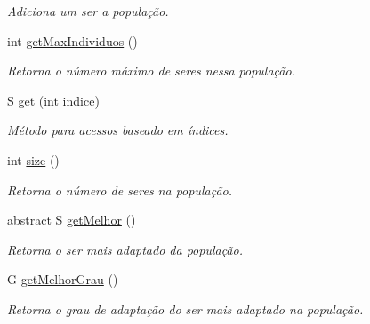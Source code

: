 \begin{DoxyCompactItemize}
\begin{DoxyCompactList}\small\item\em Adiciona um ser a população. \end{DoxyCompactList}\item 
int \hyperlink{classic_1_1populacional_1_1_populacao_3_01_g_01extends_01_number_01_6_comparable_3_01_g_01_4_00_506237fa66af7bbd01f529b68d4beaca_a3c5abfad17ad8ea60283da169c385315}{get\-Max\-Individuos} ()
\begin{DoxyCompactList}\small\item\em Retorna o número máximo de seres nessa população. \end{DoxyCompactList}\item 
S \hyperlink{classic_1_1populacional_1_1_populacao_3_01_g_01extends_01_number_01_6_comparable_3_01_g_01_4_00_506237fa66af7bbd01f529b68d4beaca_acbcdb216574082cb970be119c590200d}{get} (int indice)
\begin{DoxyCompactList}\small\item\em Método para acessos baseado em índices. \end{DoxyCompactList}\item 
int \hyperlink{classic_1_1populacional_1_1_populacao_3_01_g_01extends_01_number_01_6_comparable_3_01_g_01_4_00_506237fa66af7bbd01f529b68d4beaca_a39f905ac398bd8ea00b8babb6d16c43a}{size} ()
\begin{DoxyCompactList}\small\item\em Retorna o número de seres na população. \end{DoxyCompactList}\item 
abstract S \hyperlink{classic_1_1populacional_1_1_populacao_3_01_g_01extends_01_number_01_6_comparable_3_01_g_01_4_00_506237fa66af7bbd01f529b68d4beaca_a1bbf2653a1ed8b5e5c1af9333767a033}{get\-Melhor} ()
\begin{DoxyCompactList}\small\item\em Retorna o ser mais adaptado da população. \end{DoxyCompactList}\item 
G \hyperlink{classic_1_1populacional_1_1_populacao_3_01_g_01extends_01_number_01_6_comparable_3_01_g_01_4_00_506237fa66af7bbd01f529b68d4beaca_a4ec654326f5d9a6cfec73dd55d4bd6b0}{get\-Melhor\-Grau} ()
\begin{DoxyCompactList}\small\item\em Retorna o grau de adaptação do ser mais adaptado na população. \end{DoxyCompactList}\item 

\end{DoxyCompactItemize}
